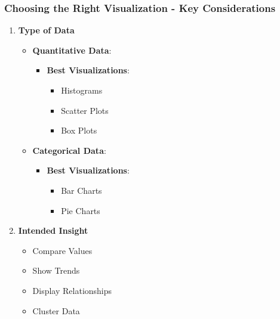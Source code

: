 \documentclass[aspectratio=169]{beamer}
\begin{document}
\begin{frame}[fragile]
    \frametitle{Choosing the Right Visualization - Key Considerations}
    \begin{enumerate}
        \item \textbf{Type of Data}
        \begin{itemize}
            \item \textbf{Quantitative Data}:
            \begin{itemize}
                \item \textbf{Best Visualizations}:
                \begin{itemize}
                    \item Histograms
                    \item Scatter Plots
                    \item Box Plots
                \end{itemize}
            \end{itemize}
            \item \textbf{Categorical Data}:
            \begin{itemize}
                \item \textbf{Best Visualizations}:
                \begin{itemize}
                    \item Bar Charts
                    \item Pie Charts
                \end{itemize}
            \end{itemize}
        \end{itemize}
        
        \item \textbf{Intended Insight}
        \begin{itemize}
            \item Compare Values
            \item Show Trends
            \item Display Relationships
            \item Cluster Data
        \end{itemize}
    \end{enumerate}
\end{frame}
\end{document}
